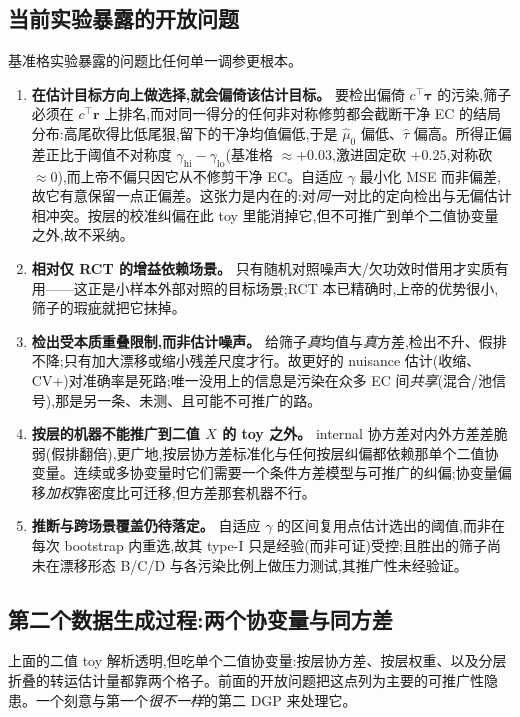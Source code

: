 \documentclass[11pt]{article}
\begin{document}
\subsection{当前实验暴露的开放问题}

基准格实验暴露的问题比任何单一调参更根本。
\begin{enumerate}
    \item \textbf{在估计目标方向上做选择,就会偏倚该估计目标。} 要检出偏倚 $c^{\top}\bm\tau$ 的污染,筛子必须在 $c^{\top}\bm r$ 上排名,而对同一得分的任何非对称修剪都会截断干净 EC 的结局分布:高尾砍得比低尾狠,留下的干净均值偏低,于是 $\widehat\mu_0$ 偏低、$\widehat\tau$ 偏高。所得正偏差正比于阈值不对称度 $\gamma_{\mathrm{hi}}-\gamma_{\mathrm{lo}}$(基准格 $\approx{+}0.03$,激进固定砍 ${+}0.25$,对称砍 $\approx0$),而上帝不偏只因它从不修剪干净 EC。自适应 $\gamma$ 最小化 MSE 而非偏差,故它有意保留一点正偏差。这张力是内在的:对\emph{同一}对比的定向检出与无偏估计相冲突。按层的校准纠偏在此 toy 里能消掉它,但不可推广到单个二值协变量之外,故不采纳。
    \item \textbf{相对仅 RCT 的增益依赖场景。} 只有随机对照噪声大/欠功效时借用才实质有用——这正是小样本外部对照的目标场景;RCT 本已精确时,上帝的优势很小,筛子的瑕疵就把它抹掉。
    \item \textbf{检出受本质重叠限制,而非估计噪声。} 给筛子\emph{真}均值与\emph{真}方差,检出不升、假排不降;只有加大漂移或缩小残差尺度才行。故更好的 nuisance 估计(收缩、CV+)对准确率是死路;唯一没用上的信息是污染在众多 EC 间\emph{共享}(混合/池信号),那是另一条、未测、且可能不可推广的路。
    \item \textbf{按层的机器不能推广到二值 $X$ 的 toy 之外。} internal 协方差对内外方差差脆弱(假排翻倍),更广地,按层协方差标准化与任何按层纠偏都依赖那单个二值协变量。连续或多协变量时它们需要一个条件方差模型与可推广的纠偏;协变量偏移\emph{加权}靠密度比可迁移,但方差那套机器不行。
    \item \textbf{推断与跨场景覆盖仍待落定。} 自适应 $\gamma$ 的区间复用点估计选出的阈值,而非在每次 bootstrap 内重选,故其 type-I 只是经验(而非可证)受控;且胜出的筛子尚未在漂移形态 B/C/D 与各污染比例上做压力测试,其推广性未经验证。
\end{enumerate}

\subsection{第二个数据生成过程:两个协变量与同方差}\label{sec:dgp2}

上面的二值 toy 解析透明,但吃单个二值协变量:按层协方差、按层权重、以及分层折叠的转运估计量都靠两个格子。前面的开放问题把这点列为主要的可推广性隐患。一个刻意与第一个\emph{很不一样}的第二 DGP 来处理它。
\end{document}
